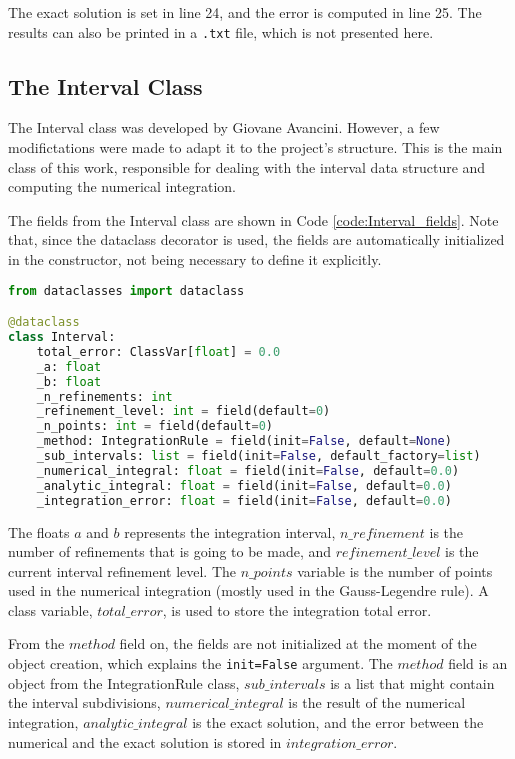 The exact solution is set in line 24, and the error is computed in line 25. The results can also be printed in a \texttt{.txt} file, which is not presented here.

\subsection{The Interval Class}
The Interval class was developed by Giovane Avancini. However, a few modifictations were made to adapt it to the project's structure. This is the main class of this work, responsible for dealing with the interval data structure and computing the numerical integration.

The fields from the Interval class are shown in Code \ref{code:Interval_fields}. Note that, since the dataclass decorator is used, the fields are automatically initialized in the constructor, not being necessary to define it explicitly.
\begin{lstlisting}[language=python, caption={Interval class fields.}, label={code:Interval_fields}]
from dataclasses import dataclass

@dataclass
class Interval:
    total_error: ClassVar[float] = 0.0
    _a: float
    _b: float
    _n_refinements: int
    _refinement_level: int = field(default=0)
    _n_points: int = field(default=0)
    _method: IntegrationRule = field(init=False, default=None)
    _sub_intervals: list = field(init=False, default_factory=list)
    _numerical_integral: float = field(init=False, default=0.0)
    _analytic_integral: float = field(init=False, default=0.0)
    _integration_error: float = field(init=False, default=0.0)
\end{lstlisting}

The floats $a$ and $b$ represents the integration interval, $n\_refinement$ is the number of refinements that is going to be made, and ${refinement\_level}$ is the current interval refinement level. The $n\_points$ variable is the number of points used in the numerical integration (mostly used in the Gauss-Legendre rule). A class variable, $total\_error$, is used to store the integration total error.

From the $method$ field on, the fields are not initialized at the moment of the object creation, which explains the \texttt{init=False} argument. The $method$ field is an object from the IntegrationRule class, $sub\_intervals$ is a list that might contain the interval subdivisions, $numerical\_integral$ is the result of the numerical integration, $analytic\_integral$ is the exact solution, and the error between the numerical and the exact solution is stored in $integration\_error$.

